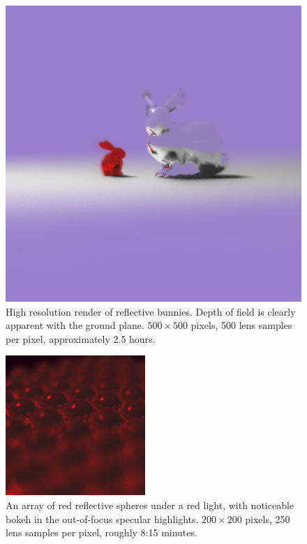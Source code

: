 \documentclass[twocolumn]{article}
\begin{document}
\begin{figure}[h]
    \centering
    \includegraphics[scale=0.45]{img/hires_blurry_buns.png}
    \caption{High resolution render of reflective bunnies. Depth of field is clearly
    apparent with the ground plane. $500\times 500$ pixels,
    500 lens samples per pixel, approximately 2.5 hours.}
    \label{fig:hires_blurry_buns}
\end{figure}

\begin{figure}[ht]
    \centering
    \includegraphics{img/red_sphere_array_correct.png}
    \caption{An array of red reflective spheres under a red light, with noticeable
    bokeh in the out-of-focus specular highlights. $200\times 200$ pixels, 250 lens
    samples per pixel, roughly 8:15 minutes.}
    \label{fig:red_sphere_array_correct}
\end{figure}
\end{document}
